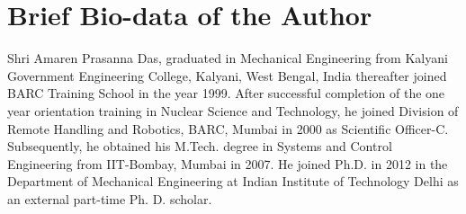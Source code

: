\chapter*{\textbf{Brief Bio-data of the Author}}
Shri Amaren Prasanna Das, graduated in Mechanical Engineering from Kalyani Government Engineering College, Kalyani, West Bengal, India thereafter joined BARC Training School in the year 1999. After successful completion of the one year orientation training in Nuclear Science and Technology, he joined Division of Remote Handling and Robotics, BARC, Mumbai in 2000 as Scientific Officer-C. Subsequently, he obtained his M.Tech. degree in Systems and Control Engineering from IIT-Bombay, Mumbai in 2007. He joined Ph.D. in 2012 in the Department of Mechanical Engineering at Indian Institute of Technology Delhi as an external part-time Ph. D. scholar.
